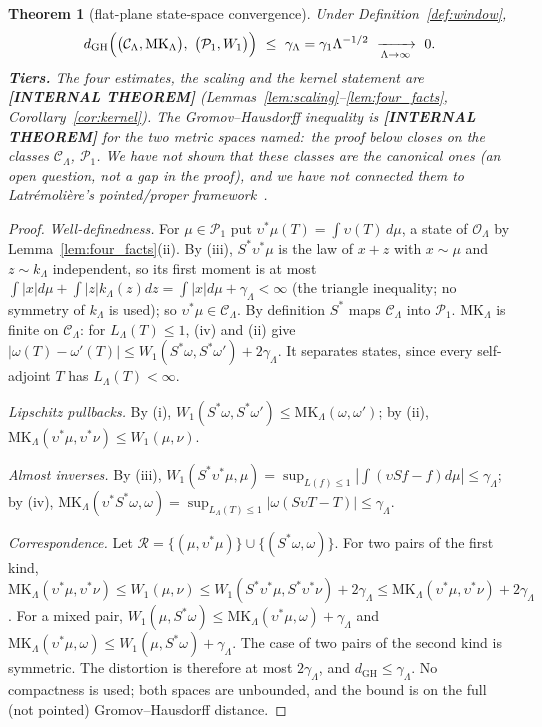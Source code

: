 \documentclass[11pt,a4paper]{article}
\theoremstyle{plain}
\newtheorem{theorem}{Theorem}[section]
\theoremstyle{definition}
\newcommand{\Op}{\mathcal{O}}
\newcommand{\MK}{\mathrm{MK}}
\newcommand{\Prob}{\mathcal{P}_{1}}
\newcommand{\Cst}{\mathcal{C}}
\begin{document}
\begin{theorem}[flat-plane state-space convergence]\label{thm:plane_gh}
Under Definition~\ref{def:window},
\[
d_{\mathrm{GH}}\Bigl(\bigl(\Cst_{\Lambda},\MK_{\Lambda}\bigr),\
\bigl(\Prob,W_{1}\bigr)\Bigr)\ \le\ \gamma_{\Lambda}
=\gamma_{1}\Lambda^{-1/2}\ \xrightarrow[\Lambda\to\infty]{}\ 0 .
\]
\textbf{Tiers.} The four estimates, the scaling and the kernel
statement are \textbf{[INTERNAL THEOREM]}
(Lemmas~\ref{lem:scaling}--\ref{lem:four_facts},
Corollary~\ref{cor:kernel}). The Gromov--Hausdorff inequality is
\textbf{[INTERNAL THEOREM]} for the two metric spaces named:\ the proof below
closes on the classes $\Cst_{\Lambda}$, $\Prob$. We have not shown that these
classes are the canonical ones (an open question, not a gap in the proof), and we have not connected them to Latr\'emoli\`ere's
pointed/proper framework~\cite{latremoliere2025}.
\end{theorem}

\begin{proof}
\emph{Well-definedness.} For $\mu\in\Prob$ put $\upsilon^{*}\mu(T)=
\int\upsilon(T)\,d\mu$, a state of $\Op_{\Lambda}$ by
Lemma~\ref{lem:four_facts}(ii). By (iii), $S^{*}\upsilon^{*}\mu$ is the law of $x+z$ with
$x\sim\mu$ and $z\sim k_{\Lambda}$ independent, so its first moment is at
most $\int|x|d\mu+\int|z|k_{\Lambda}(z)dz=\int|x|d\mu+\gamma_{\Lambda}<\infty$
(the triangle inequality; no symmetry of $k_{\Lambda}$ is used); so $\upsilon^{*}\mu\in
\Cst_{\Lambda}$. By definition $S^{*}$ maps $\Cst_{\Lambda}$ into $\Prob$.
$\MK_{\Lambda}$ is finite on $\Cst_{\Lambda}$: for $L_{\Lambda}(T)\le1$,
(iv) and (ii) give $|\omega(T)-\omega'(T)|\le W_{1}(S^{*}\omega,
S^{*}\omega')+2\gamma_{\Lambda}$. It separates states, since every
self-adjoint $T$ has $L_{\Lambda}(T)<\infty$.

\emph{Lipschitz pullbacks.} By (i), $W_{1}(S^{*}\omega,S^{*}\omega')\le
\MK_{\Lambda}(\omega,\omega')$; by (ii), $\MK_{\Lambda}(\upsilon^{*}\mu,
\upsilon^{*}\nu)\le W_{1}(\mu,\nu)$.

\emph{Almost inverses.} By (iii), $W_{1}(S^{*}\upsilon^{*}\mu,\mu)=
\sup_{L(f)\le1}|\int(\upsilon S f-f)d\mu|\le\gamma_{\Lambda}$; by (iv),
$\MK_{\Lambda}(\upsilon^{*}S^{*}\omega,\omega)=\sup_{L_{\Lambda}(T)\le1}
|\omega(S\upsilon T-T)|\le\gamma_{\Lambda}$.

\emph{Correspondence.} Let $\mathcal R=\{(\mu,\upsilon^{*}\mu)\}\cup
\{(S^{*}\omega,\omega)\}$. For two pairs of the first kind,
$\MK_{\Lambda}(\upsilon^{*}\mu,\upsilon^{*}\nu)\le W_{1}(\mu,\nu)\le
W_{1}(S^{*}\upsilon^{*}\mu,S^{*}\upsilon^{*}\nu)+2\gamma_{\Lambda}\le
\MK_{\Lambda}(\upsilon^{*}\mu,\upsilon^{*}\nu)+2\gamma_{\Lambda}$. For
a mixed pair, $W_{1}(\mu,S^{*}\omega)\le\MK_{\Lambda}(\upsilon^{*}\mu,
\omega)+\gamma_{\Lambda}$ and $\MK_{\Lambda}(\upsilon^{*}\mu,\omega)\le
W_{1}(\mu,S^{*}\omega)+\gamma_{\Lambda}$. The case of two pairs of the
second kind is symmetric. The distortion is therefore at most
$2\gamma_{\Lambda}$, and $d_{\mathrm{GH}}\le\gamma_{\Lambda}$. No
compactness is used; both spaces are unbounded, and the bound is on the
full (not pointed) Gromov--Hausdorff distance.
\end{proof}
\end{document}
